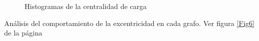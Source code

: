 \documentclass{article}
\begin{document}
\begin{figure}[htbp]
\caption{Histogramas de la centralidad de carga}
\label{Fig5} 
\end{figure}

Análisis del comportamiento de la excentricidad en cada grafo. Ver figura \ref{Fig6} de la página \pageref{Fig6} 
\end{document}
